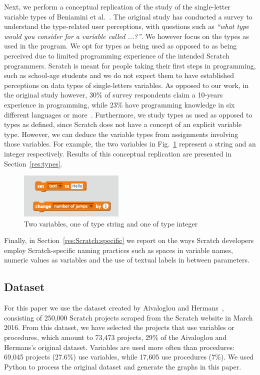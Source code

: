 \documentclass[conference]{IEEEtran}
\begin{document}
Next, we perform a conceptual replication of the study of the single-letter variable types of Beniamini et al.~\cite{Beniamini}. 
The original study has conducted a survey to understand the type-related user perceptions, with questions such as \emph{``what type would you consider for a variable called ...?''}. We however focus on the types as used in the program. 
We opt for types as being used as opposed to as being perceived due to limited programming experience of the intended Scratch programmers.
Scratch is meant for people taking their first steps in programming, such as school-age students and we do not expect them to have established  perceptions on data types of single-letters variables. 
As opposed to our work, in the original study however, 30\% of survey respondents claim a 10-years experience in programming, while  23\% have programming knowledge in six different languages or more~\cite{Beniamini}. 
Furthermore, we study types as used as opposed to types as defined, since Scratch does not have a concept of an explicit variable type.
However, we can deduce the variable types from assignments involving those variables. 
For example, the two variables in Fig.~\ref{fig:types} represent a string and an integer respectively. 
Results of this conceptual replication are presented in Section~\ref{res:types}.

\begin{figure}
	\begin{center}
		\includegraphics[width=5cm]{fig/types}
		\caption{Two variables, one of type string and one of type integer}
		\label{fig:types}
	\end{center}
\end{figure} 

Finally, in Section~\ref{res:Scratch:specific} we report on the ways Scratch developers employ Scratch-specific naming practices such as spaces in variable names, numeric values as variables and the use of textual labels in between parameters.

\subsection{Dataset}
For this paper we use the dataset created by Aivaloglou and Hermans~\cite{Aivaloglou2016HowKC}, consisting of 250,000 Scratch projects scraped from the Scratch website in March 2016. 
From this dataset, we have selected the projects that use variables or procedures, which amount to 73,473 projects, 29\% of the Aivaloglou and Hermans's original dataset. 
Variables are used more often than procedures: 69,045 projects (27.6\%) use variables, while 17,605 use procedures (7\%). 
We used Python to process the original dataset and generate the graphs in this paper.
\end{document}
